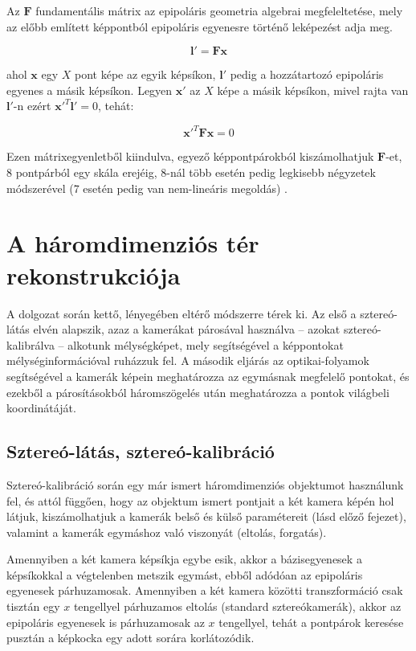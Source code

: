 Az $\mathbf{F}$ fundamentális mátrix az epipoláris geometria algebrai megfeleltetése, mely az előbb említett képpontból epipoláris egyenesre történő leképezést adja meg.

\[\mathbf{l}' = \mathbf{F}\mathbf{x}\]

ahol $\mathbf{x}$ egy $X$ pont képe az egyik képsíkon, $\mathbf{l}'$ pedig a hozzátartozó epipoláris egyenes a másik képsíkon. Legyen $\mathbf{x}'$ az $X$ képe a másik képsíkon, mivel rajta van $\mathbf{l}'$-n ezért $\mathbf{x}'^T \mathbf{l}' = 0$, tehát:

\[\mathbf{x}'^T\mathbf{F}\mathbf{x} = 0\]

Ezen mátrixegyenletből kiindulva, egyező képpontpárokból kiszámolhatjuk $\mathbf{F}$-et, 8 pontpárból egy skála erejéig, 8-nál több esetén pedig legkisebb négyzetek módszerével (7 esetén pedig van nem-lineáris megoldás) \cite[10.1 alfejezet]{HZ}.

\section{A háromdimenziós tér rekonstrukciója \label{sec:methods}}


A dolgozat során kettő, lényegében eltérő módszerre térek ki. Az első a sztereó-látás elvén alapszik, azaz a kamerákat párosával használva -- azokat sztereó-kalibrálva -- alkotunk mélységképet, mely segítségével a képpontokat mélységinformációval ruházzuk fel. A második eljárás az optikai-folyamok segítségével a kamerák képein meghatározza az egymásnak megfelelő pontokat, és ezekből a párosításokból háromszögelés után meghatározza a pontok világbeli koordinátáját.

\subsection{Sztereó-látás, sztereó-kalibráció}

Sztereó-kalibráció \cite{camera-calib-3d} során egy már ismert háromdimenziós objektumot használunk fel, és attól függően, hogy az objektum ismert pontjait a két kamera képén hol látjuk, kiszámolhatjuk a kamerák belső és külső paramétereit (lásd előző fejezet), valamint a kamerák egymáshoz való viszonyát (eltolás, forgatás). 

Amennyiben a két kamera képsíkja egybe esik, akkor a bázisegyenesek a képsíkokkal a végtelenben metszik egymást, ebből adódóan az epipoláris egyenesek párhuzamosak. Amennyiben a két kamera közötti transzformáció csak tisztán egy $x$ tengellyel párhuzamos eltolás (standard sztereókamerák), akkor az epipoláris egyenesek is párhuzamosak az $x$ tengellyel, tehát a pontpárok keresése pusztán a képkocka egy adott sorára korlátozódik.

